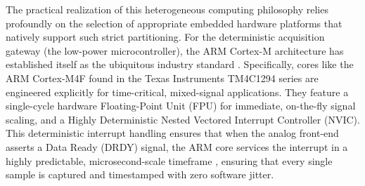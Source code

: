 The practical realization of this heterogeneous computing philosophy relies profoundly on the selection of appropriate embedded hardware platforms that natively support such strict partitioning. For the deterministic acquisition gateway (the low-power microcontroller), the ARM Cortex-M architecture has established itself as the ubiquitous industry standard \cite{Beats}. Specifically, cores like the ARM Cortex-M4F found in the Texas Instruments TM4C1294 series \cite{ti_tm4c1294} are engineered explicitly for time-critical, mixed-signal applications. They feature a single-cycle hardware Floating-Point Unit (FPU) for immediate, on-the-fly signal scaling, and a Highly Deterministic Nested Vectored Interrupt Controller (NVIC). This deterministic interrupt handling ensures that when the analog front-end asserts a Data Ready (DRDY) signal, the ARM core services the interrupt in a highly predictable, microsecond-scale timeframe \cite{battaglia2022eeg}, ensuring that every single sample is captured and timestamped with zero software jitter.

